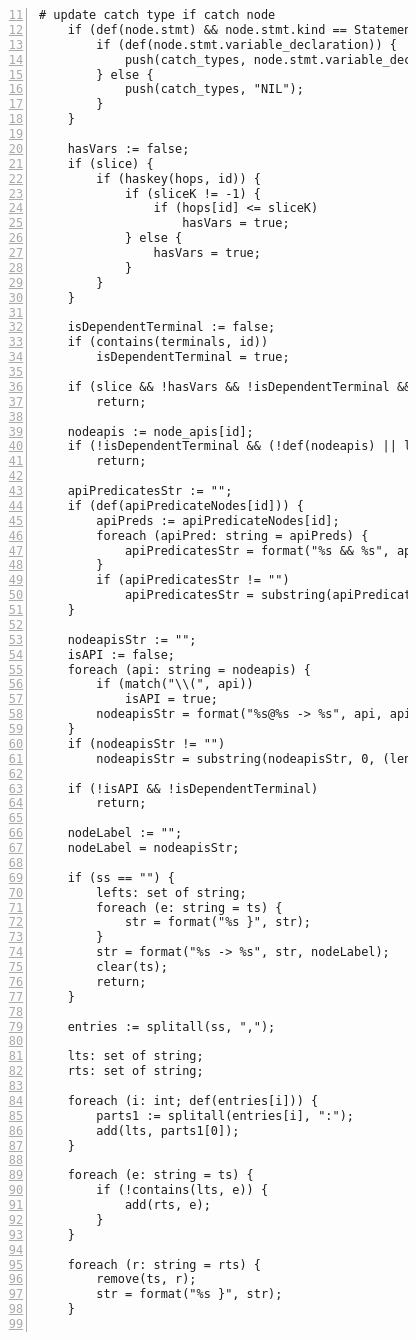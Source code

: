 \begin{figure}[ht!]
\begin{lstlisting}[numbers=left, tabsize=4, escapechar=@, caption={API Usage Mining Analysis},label={lst:aun-code}, firstline = 11, firstnumber = 11, lastline = 60]
	# update catch type if catch node
	if (def(node.stmt) && node.stmt.kind == StatementKind.CATCH) {
	    if (def(node.stmt.variable_declaration)) {
	        push(catch_types, node.stmt.variable_declaration.variable_type.name);    
	    } else {
	        push(catch_types, "NIL");
	    }
	}
	
	hasVars := false;
	if (slice) {
		if (haskey(hops, id)) {
			if (sliceK != -1) {
				if (hops[id] <= sliceK)
					hasVars = true;
			} else {
				hasVars = true;
			}	
		}
	}
	    
	isDependentTerminal := false;
	if (contains(terminals, id))
	    isDependentTerminal = true;
	    
	if (slice && !hasVars && !isDependentTerminal && !hasCatchOrFinally(ss))
	    return;
	    
	nodeapis := node_apis[id];
	if (!isDependentTerminal && (!def(nodeapis) || len(nodeapis) == 0))
	    return;
	    
	apiPredicatesStr := "";
	if (def(apiPredicateNodes[id])) { 
	    apiPreds := apiPredicateNodes[id];
	    foreach (apiPred: string = apiPreds) {
	        apiPredicatesStr = format("%s && %s", apiPredicatesStr, apiPred);
	    }
	    if (apiPredicatesStr != "")
	        apiPredicatesStr = substring(apiPredicatesStr, 4);
	}
	
	nodeapisStr := "";    
	isAPI := false;
	foreach (api: string = nodeapis) {
	    if (match("\\(", api))
	        isAPI = true;
	    nodeapisStr = format("%s@%s -> %s", api, apiPredicatesStr, nodeapisStr);    
	}
	if (nodeapisStr != "")
	    nodeapisStr = substring(nodeapisStr, 0, (len(nodeapisStr) - 4));
	    
	if (!isAPI && !isDependentTerminal) 
	    return;
	    
	nodeLabel := ""; 
	nodeLabel = nodeapisStr; 
	
	if (ss == "") {
	    lefts: set of string;
	    foreach (e: string = ts) {
            str = format("%s }", str);
	    }
	    str = format("%s -> %s", str, nodeLabel);
	    clear(ts);
		return;
	}
		
	entries := splitall(ss, ",");
	
	lts: set of string; 
	rts: set of string;
	
	foreach (i: int; def(entries[i])) {
		parts1 := splitall(entries[i], ":");
		add(lts, parts1[0]);
	}	
	
	foreach (e: string = ts) {
		if (!contains(lts, e)) {
			add(rts, e);
		}
	}
	
	foreach (r: string = rts) {
		remove(ts, r);
		str = format("%s }", str);
	}
	

\end{lstlisting}
\end{figure}
